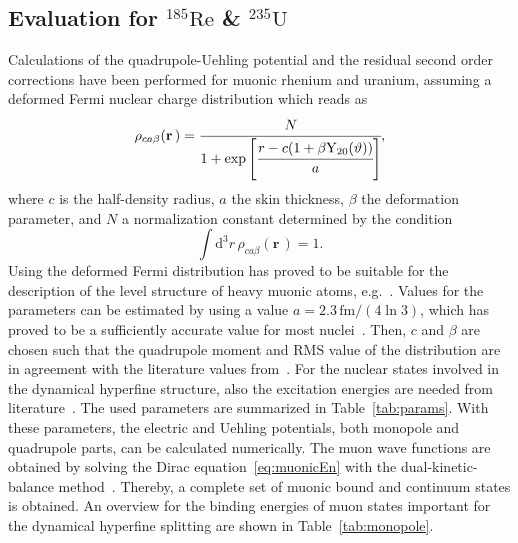 \subsection{Evaluation for $^{185}\text{Re}$ \& $^{235}\text{U}$}
Calculations of the quadrupole-Uehling potential and the residual second order corrections have been performed for muonic rhenium and uranium, assuming a deformed Fermi nuclear charge distribution which reads as
\begin{equation}
\rho_{ca\beta}(\mathbf{r}\,)=\cfrac{N}{1+\exp \left[\cfrac{r-c(1+\beta \text{Y}_{20}(\vartheta))}{a}\right]},
\label{eq:deffermi_2}
\end{equation}
where $c$ is the half-density radius, $a$ the skin thickness, $\beta$ the deformation parameter, and $N$ a normalization constant determined by the condition
\begin{equation}
\int \text{d}^3r\, \rho_{ca\beta}(\mathbf{r}\,)=1.
\end{equation}
Using the deformed Fermi distribution has proved to be suitable for the description of the level structure of heavy muonic atoms, e.g.~\cite{hitlin1970,tanaka1984,tanaka1984_2}.
Values for the parameters can be estimated by using a value ${a}{=}{2.3\,\text{fm}/(4\ln 3)}$, which has proved to be a sufficiently accurate value for most nuclei~\cite{Beier2000}. Then, $c$ and $\beta$ are chosen such that the quadrupole moment and RMS value of the distribution are in agreement with the literature values from~\cite{Angeli2013,Stone2005}. For the nuclear states involved in the dynamical hyperfine structure, also the excitation energies are needed from literature~\cite{ENSDF}. The used parameters are summarized in Table~\ref{tab:params}.
With these parameters, the electric and Uehling potentials, both monopole and quadrupole parts, can be calculated numerically. The muon wave functions are obtained by solving the Dirac equation~\eqref{eq:muonicEn} with the dual-kinetic-balance method~\cite{Shabaev2004}. Thereby, a complete set of muonic bound and continuum states is obtained. An overview for the binding energies of muon states important for the dynamical hyperfine splitting are shown in Table~\ref{tab:monopole}.

